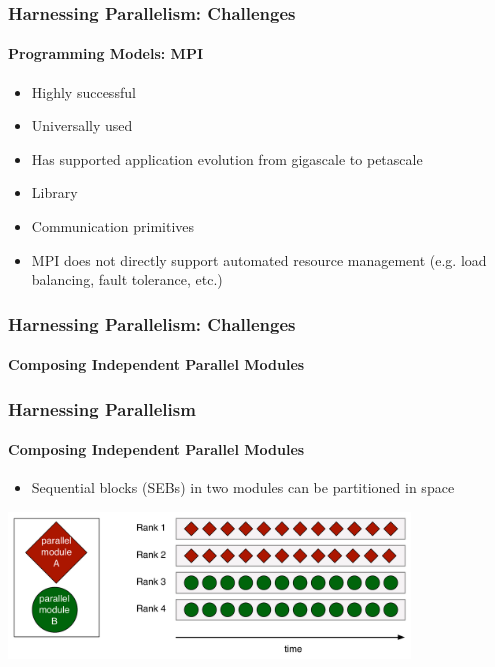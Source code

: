 \begin{frame}[t]
\frametitle{Harnessing Parallelism: Challenges}
\framesubtitle{Programming Models: MPI}
  \begin{itemize}
    \item Highly successful
    \item Universally used
    \item Has supported application evolution from gigascale to petascale
  \end{itemize}
  \begin{itemize}
    \item Library
    \item Communication primitives
  \end{itemize}
  \begin{itemize}
    \item MPI does not directly support automated resource management
      (e.g. load balancing, fault tolerance, etc.)
  \end{itemize}
\end{frame}



%     


%     

\begin{frame}[fragile]
\frametitle{Harnessing Parallelism: Challenges}
\framesubtitle{Composing Independent Parallel Modules}
  \frametitle{Harnessing Parallelism}
  \framesubtitle{Composing Independent Parallel Modules}
  \begin{itemize}
    \item Sequential blocks (SEBs) in two modules can be partitioned in space
  \end{itemize}
  \begin{center}
    \includegraphics[width=0.8\textwidth]{figures/spaceDivision.pdf}
  \end{center}
\end{frame}

